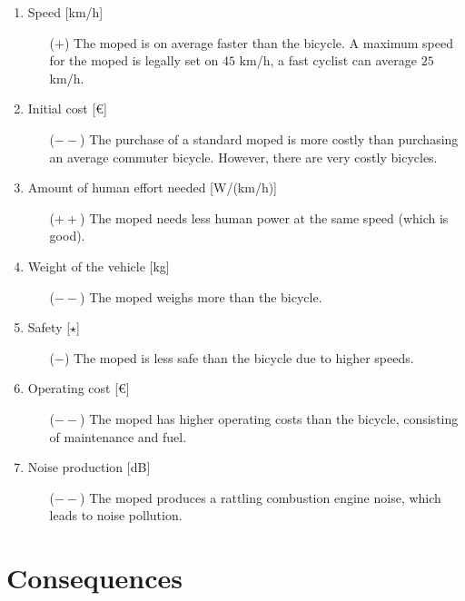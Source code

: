\documentclass[a4paper]{article}
\begin{document}
\begin{enumerate}
\item Speed [km/h]
    \begin{enumerate}
    \item[($+$)] The moped is on average faster than the bicycle. A maximum speed for the moped is legally set on $45$ km/h, a fast cyclist can average $25$ km/h.
    \end{enumerate}
\item Initial cost [€]
    \begin{enumerate}
    \item[($--$)] The purchase of a standard moped is more costly than purchasing an average commuter bicycle. However, there are very costly bicycles.
    \end{enumerate}
\item Amount of human effort needed [W/(km/h)]
    \begin{enumerate}
    \item[($++$)] The moped needs less human power at the same speed (which is good).
    \end{enumerate}
\item Weight of the vehicle [kg]
    \begin{enumerate}
    \item[($--$)] The moped weighs more than the bicycle.
    \end{enumerate}
\item Safety [$\star$]
    \begin{enumerate}
    \item[($-$)] The moped is less safe than the bicycle due to higher speeds.
    \end{enumerate}
\item Operating cost [€]
    \begin{enumerate}
    \item[($--$)] The moped has higher operating costs than the bicycle, consisting of maintenance and fuel.
    \end{enumerate}
\item Noise production [dB]
    \begin{enumerate}
    \item[($--$)] The moped produces a rattling combustion engine noise, which leads to noise pollution.
    \end{enumerate}
\end{enumerate}

\section{Consequences}
\label{sec:consequences}
\end{document}
